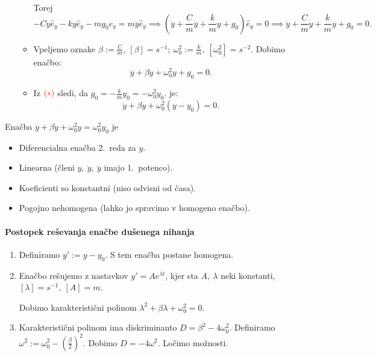 \begin{enumerate}
\begin{itemize}
\begin{itemize}
        \end{itemize}
        Torej 
        \[
        -C \dot{y} \widehat{e}_y - ky\widehat{e}_y -mg_0 \widehat{e}_y = m \ddot{y} \widehat{e}_y \implies 
        \left( \ddot{y} + \frac{C}{m} \dot{y} + \frac{k}{m} y + g_0 \right) \widehat{e}_y = 0 \implies 
        \ddot{y} + \frac{C}{m} \dot{y} + \frac{k}{m} y + g_0 = 0.
        \]
        \item Vpeljemo oznake \(\beta := \frac{C}{m}, \ [\beta]  = s^{-1}; \ \omega_0^2 := \frac{k}{m}, \ [\omega_0^2] = s^{-2}\). Dobimo enačbo:
        \[
        \ddot{y} + \beta \dot{y} + \omega_0^2 y + g_0 = 0.
        \]
        \item Iz \(\textcolor{red}{(*)}\) sledi, da \(g_0 = -\frac{k}{m}y_0 = - \omega_0^2y_0\).  
         je:
        \[
        \ddot{y} + \beta \dot{y} +  \omega_0^2 (y - y_0) = 0.
        \]        
    \end{itemize}
\end{enumerate}

\begin{opomba}
    Enačba \(\ddot{y} + \beta \dot{y} + \omega_0^2y = \omega_0^2 y_0\) je 
    \begin{itemize}
        \item Diferencialna enačba 2.\ reda za \(y\).
        \item Linearna (členi \(y, \ \dot{y}, \ \ddot{y}\) imajo 1.\ potenco).
        \item Koeficienti so konstantni (niso odvisni od časa).
        \item Pogojno nehomogena (lahko jo spravimo v homogeno enačbo).
    \end{itemize}
\end{opomba}

\paragraph{Postopek reševanja enačbe dušenega nihanja}
\begin{enumerate}
    \item Definiramo \(y' := y - y_0\). S tem enačba postane homogena.
    \item Enačbo rešujemo z nastavkov \(y' = A e^{\lambda t}\), kjer sta \(A, \ \lambda\) neki konstanti, \([\lambda] = s^{-1}, \ [A] = m\). 
    
    Dobimo karakteristični polinom \(\lambda^2 + \beta \lambda + \omega_0^2 = 0\).
    \item Karakteristični polinom ima diskriminanto \(D = \beta^2 - 4 \omega_0^2\). Definiramo \(\omega^2 := \omega_0^2 - \left(\frac{\beta}{2}\right)^2\). Dobimo \(D = - 4 \omega^2\). Ločimo možnosti.
\end{enumerate}

